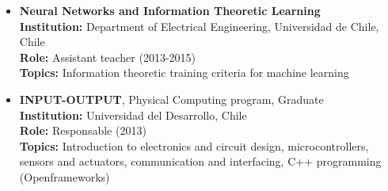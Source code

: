 \documentclass[letterpaper,11pt]{article}
\begin{document}
\begin{enumerate}[I]
\begin{itemize}
        \item \textbf{Neural Networks and Information Theoretic Learning} \\
            \textbf{Institution:} Department of Electrical Engineering, Universidad de Chile, Chile \\
            \textbf{Role:} Assistant teacher (2013-2015) \\
            \textbf{Topics:} Information theoretic training criteria for machine learning %
        \item \textbf{INPUT-OUTPUT}, Physical Computing program, Graduate \\
            \textbf{Institution:} Universidad del Desarrollo, Chile \\
            \textbf{Role:} Responsable (2013) \\
            \textbf{Topics:} Introduction to electronics and circuit design, microcontrollers, sensors and actuators, communication and interfacing, C++ programming (Openframeworks)
 
    	\end{itemize}
        

\end{enumerate}
\end{document}
